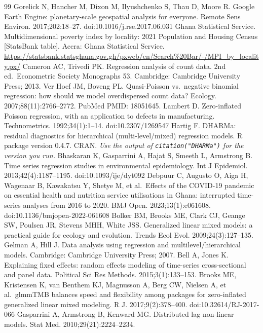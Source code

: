 \documentclass[11pt,a4paper]{article}
\begin{document}
\begin{thebibliography}{99}
 Gorelick N, Hancher M, Dixon M, Ilyushchenko S, Thau D, Moore R. Google Earth Engine: planetary-scale geospatial analysis for everyone. Remote Sens Environ. 2017;202:18--27. doi:10.1016/j.rse.2017.06.031
 Ghana Statistical Service. Multidimensional poverty index by locality: 2021 Population and Housing Census {[}StatsBank table{]}. Accra: Ghana Statistical Service. \url{https://statsbank.statsghana.gov.gh/pxweb/en/Search\%20Bar/-/MPI_by_locality.px/}
 Cameron AC, Trivedi PK. Regression analysis of count data. 2nd ed.~Econometric Society Monographs 53. Cambridge: Cambridge University Press; 2013.
 Ver Hoef JM, Boveng PL. Quasi-Poisson vs.~negative binomial regression: how should we model overdispersed count data? Ecology. 2007;88(11):2766--2772. PubMed PMID: 18051645.
 Lambert D. Zero-inflated Poisson regression, with an application to defects in manufacturing. Technometrics. 1992;34(1):1--14. doi:10.2307/1269547
 Hartig F. DHARMa: residual diagnostics for hierarchical (multi-level/mixed) regression models. R package version 0.4.7. CRAN. \emph{Use the output of \texttt{citation("DHARMa")} for the version you run.}
 Bhaskaran K, Gasparrini A, Hajat S, Smeeth L, Armstrong B. Time series regression studies in environmental epidemiology. Int J Epidemiol. 2013;42(4):1187--1195. doi:10.1093/ije/dyt092
 Debpuur C, Augusto O, Aiga H, Wagenaar B, Kawakatsu Y, Shetye M, et al.~Effects of the COVID-19 pandemic on essential health and nutrition service utilisations in Ghana: interrupted time-series analyses from 2016 to 2020. BMJ Open. 2023;13(1):e061608. doi:10.1136/bmjopen-2022-061608
 Bolker BM, Brooks ME, Clark CJ, Geange SW, Poulsen JR, Stevens MHH, White JSS. Generalized linear mixed models: a practical guide for ecology and evolution. Trends Ecol Evol. 2009;24(3):127--135.
 Gelman A, Hill J. Data analysis using regression and multilevel/hierarchical models. Cambridge: Cambridge University Press; 2007.
 Bell A, Jones K. Explaining fixed effects: random effects modeling of time-series cross-sectional and panel data. Political Sci Res Methods. 2015;3(1):133--153.
 Brooks ME, Kristensen K, van Benthem KJ, Magnusson A, Berg CW, Nielsen A, et al.~glmmTMB balances speed and flexibility among packages for zero-inflated generalized linear mixed modeling. R J. 2017;9(2):378--400. doi:10.32614/RJ-2017-066
 Gasparrini A, Armstrong B, Kenward MG. Distributed lag non-linear models. Stat Med. 2010;29(21):2224--2234.

\end{thebibliography}
\end{document}
